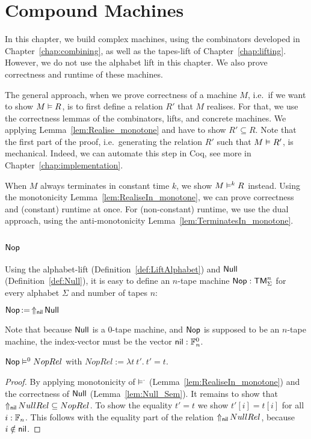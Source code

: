 \chapter{Compound Machines}
\label{chap:compound}

In this chapter, we build complex machines, using the combinators developed in Chapter~\ref{chap:combining}, as well as the tapes-lift of
Chapter~\ref{chap:lifting}.  However, we do not use the alphabet lift in this chapter.  We also prove correctness and runtime of these machines.

The general approach, when we prove correctness of a machine $M$, i.e.\ if we want to show $M \mathrel{\vDash} R$, is to first define a relation $R'$ that $M$
realises.  For that, we use the correctness lemmas of the combinators, lifts, and concrete machines.  We applying Lemma~\ref{lem:Realise_monotone} and
have to show $R' \subseteq R$.  Note that the first part of the proof, i.e.\ generating the relation $R'$ such that $M \mathrel{\vDash} R'$, is mechanical.
Indeed, we can automate this step in Coq, see more in Chapter~\ref{chap:implementation}.

When $M$ always terminates in constant time $k$, we show $M \mathrel{\vDash^{k}} R$ instead.  Using the monotonicity Lemma~\ref{lem:RealiseIn_monotone}, we
can prove correctness and (constant) runtime at once.  For (non-constant) runtime, we use the dual approach, using the anti-monotonicity
Lemma~\ref{lem:TerminatesIn_monotone}.

\section{$\Nop$}
\label{sec:Nop}

Using the alphabet-lift (Definition~\ref{def:LiftAlphabet}) and $\mathsf{Null}$ (Definition~\ref{def:Null}), it is easy to define an $n$-tape machine
$\mathsf{Nop} : \mathsf{TM}_\Sigma^n$ for every alphabet $\Sigma$ and number of tapes $n$:
\begin{definition}[$\Nop$]
  $\mathsf{Nop} \mathop{:=} \mathop{\Uparrow_{\mathsf{nil}}} \mathsf{Null}$
\end{definition}
Note that because $\mathsf{Null}$ is a 0-tape machine, and $\Nop$ is supposed to be an $n$-tape machine, the index-vector must be the vector
$\mathsf{nil} : \mathbb{F}_n^0$.

\begin{lemma}
  \label{lem:Nop_Sem}
  $\mathsf{Nop} \mathrel{\vDash^{0}} NopRel$ with $NopRel := \lambda t~t'.~t'=t$.
\end{lemma}
\begin{proof}
  By applying monotonicity of $\mathrel{\vDash^{\cdot}}$ (Lemma~\ref{lem:RealiseIn_monotone}) and the correctness of $\mathsf{Null}$ (Lemma~\ref{lem:Null_Sem}).  It
  remains to show that $\mathop{\Uparrow_{\mathsf{nil}}} NullRel \subseteq NopRel$.  To show the equality $t'=t$ we show $t'[i]=t[i]$ for all $i:\mathbb{F}_n$.  This
  follows with the equality part of the relation $\mathop{\Uparrow_{\mathsf{nil}}} NullRel$, because $i \notin \mathsf{nil}$.
\end{proof}


